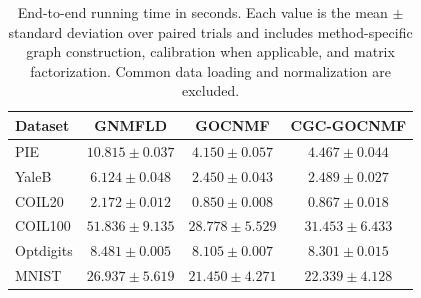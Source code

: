 \begin{table}[t]
\centering
\caption{End-to-end running time in seconds. Each value is the mean $\pm$ standard deviation over paired trials and includes method-specific graph construction, calibration when applicable, and matrix factorization. Common data loading and normalization are excluded.}\label{tab:end_to_end_time}
\setlength{\tabcolsep}{6pt}
\begin{tabular}{lccc}
\toprule
Dataset & GNMFLD & GOCNMF & CGC-GOCNMF \\
\midrule
PIE & $10.815\pm0.037$ & $4.150\pm0.057$ & $4.467\pm0.044$ \\
YaleB & $6.124\pm0.048$ & $2.450\pm0.043$ & $2.489\pm0.027$ \\
COIL20 & $2.172\pm0.012$ & $0.850\pm0.008$ & $0.867\pm0.018$ \\
COIL100 & $51.836\pm9.135$ & $28.778\pm5.529$ & $31.453\pm6.433$ \\
Optdigits & $8.481\pm0.005$ & $8.105\pm0.007$ & $8.301\pm0.015$ \\
MNIST & $26.937\pm5.619$ & $21.450\pm4.271$ & $22.339\pm4.128$ \\
\bottomrule
\end{tabular}
\end{table}
